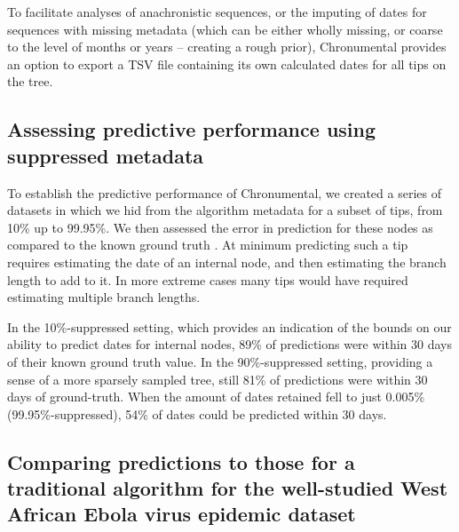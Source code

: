 To facilitate analyses of anachronistic sequences, or the imputing of dates for sequences with missing metadata (which can be either wholly missing, or coarse to the level of months or years -- creating a rough prior), Chronumental provides an option to export a TSV file containing its own calculated dates for all tips on the tree.

\subsection*{Assessing predictive performance using suppressed metadata}

To establish the predictive performance of Chronumental, we created a series of datasets in which we hid from the algorithm metadata for a subset of tips, from 10\% up to 99.95\%. We then assessed the error in prediction for these nodes as compared to the known ground truth . At minimum predicting such a tip requires estimating the date of an internal node, and then estimating the branch length to add to it. In more extreme cases many tips would have required estimating multiple branch lengths.

In the 10\%-suppressed setting, which provides an indication of the bounds on our ability to predict dates for internal nodes, 89\% of predictions were within 30 days of their known ground truth value. In the 90\%-suppressed setting, providing a sense of a more sparsely sampled tree, still 81\% of predictions were within 30 days of ground-truth.  When the amount of dates retained fell to just 0.005\% (99.95\%-suppressed), 54\% of dates could be predicted within 30 days.





\subsection*{Comparing predictions to those for a traditional algorithm for the well-studied West African Ebola virus epidemic dataset}

